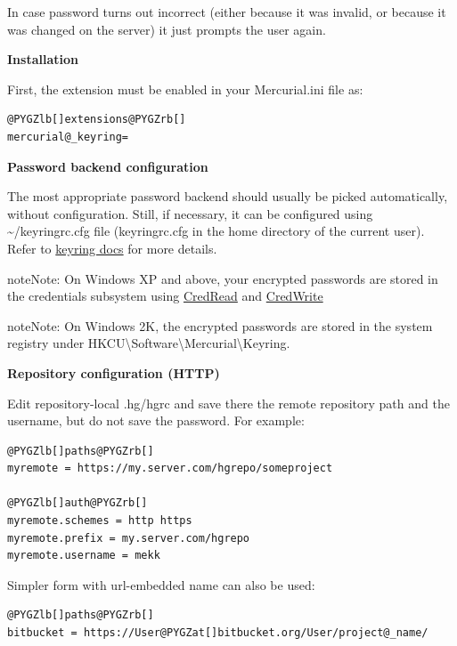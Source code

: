 \documentclass[letterpaper,10pt,english]{manual}
\begin{document}
In case password turns out incorrect (either because it was invalid, or
because it was changed on the server) it just prompts the user again.

\textbf{Installation}

First, the extension must be enabled in your Mercurial.ini file as:

\begin{Verbatim}[commandchars=@\[\]]
@PYGZlb[]extensions@PYGZrb[]
mercurial@_keyring=
\end{Verbatim}

\textbf{Password backend configuration}

The most appropriate password backend should usually be picked automatically,
without configuration. Still, if necessary, it can be configured using
\textasciitilde{}/keyringrc.cfg file (keyringrc.cfg in the home directory of the current user).
Refer to \href{http://pypi.python.org/pypi/keyring}{keyring docs}
for more details.

\begin{notice}{note}{Note:}
On Windows XP and above, your encrypted passwords are stored in the
credentials subsystem using
\href{http://msdn.microsoft.com/en-us/library/aa374804\%28VS.85\%29.aspx}{CredRead} and \href{http://msdn.microsoft.com/en-us/library/aa375187\%28VS.85\%29.aspx}{CredWrite}
\end{notice}

\begin{notice}{note}{Note:}
On Windows 2K, the encrypted passwords are stored in the system
registry under HKCU\textbackslash{}Software\textbackslash{}Mercurial\textbackslash{}Keyring.
\end{notice}

\textbf{Repository configuration (HTTP)}

Edit repository-local .hg/hgrc and save there the remote repository path and
the username, but do not save the password. For example:

\begin{Verbatim}[commandchars=@\[\]]
@PYGZlb[]paths@PYGZrb[]
myremote = https://my.server.com/hgrepo/someproject

@PYGZlb[]auth@PYGZrb[]
myremote.schemes = http https
myremote.prefix = my.server.com/hgrepo
myremote.username = mekk
\end{Verbatim}

Simpler form with url-embedded name can also be used:

\begin{Verbatim}[commandchars=@\[\]]
@PYGZlb[]paths@PYGZrb[]
bitbucket = https://User@PYGZat[]bitbucket.org/User/project@_name/
\end{Verbatim}
\end{document}
